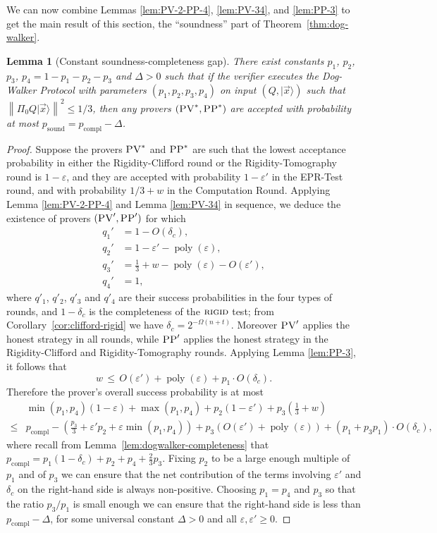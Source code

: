 \documentclass[11pt]{article}
\newtheorem{lemma}[theorem]{Lemma}
\theoremstyle{remark}
\theoremstyle{definition}
\newcommand{\ket}[1]{|#1\rangle}
\DeclareMathOperator{\poly}{poly}
\newcommand{\norm}[1]{\left\|#1\right\|}
\newcommand{\eps}{\varepsilon}
\newcommand{\rigid}{\textsc{rigid}}
\newcommand{\pv}{\textsc{PV}}
\newcommand{\pp}{\textsc{PP}}
\begin{document}
We can now combine Lemmas \ref{lem:PV-2-PP-4}, \ref{lem:PV-34}, and \ref{lem:PP-3} to get the main result of this section, the ``soundness'' part of Theorem~\ref{thm:dog-walker}.

\begin{lemma}[Constant soundness-completeness gap]\label{lem:dogwalker-soundness}
 There exist constants $p_1$, $p_2$, $p_3$, $p_4=1-p_1-p_2-p_3$ and $\Delta>0$ such that if the verifier executes the Dog-Walker Protocol with parameters $(p_1,p_2,p_3,p_4)$ on input $(Q,\ket{\vec{x}})$ such that $\norm{\Pi_0 Q\ket{\vec{x}}}^2\leq 1/3$, then any provers $(\pv^*,\pp^*)$ are accepted with probability at most $p_{\mathrm{sound}}=p_{\mathrm{compl}}-\Delta$. 
\end{lemma}

\begin{proof}
Suppose the provers $\pv^*$ and $\pp^*$ are such that the lowest acceptance probability in either the Rigidity-Clifford round or the Rigidity-Tomography round is $1- \eps$, and they are accepted with probability $1-\eps'$ in the EPR-Test round, and with probability $1/3+w$ in the Computation Round. Applying  Lemma \ref{lem:PV-2-PP-4} and Lemma \ref{lem:PV-34} in sequence, we deduce the existence of provers $(\pv',\pp')$ for which
\begin{align*}
q_1' &= 1- O(\delta_c), \\  q_2' &= 1-\eps'- \poly(\eps), \\ q_3' &= \frac13+w-
  \poly(\eps)-O(\eps'),\\ q_4' &= 1,
\end{align*}
where $q'_1$, $q'_2$, $q'_3$ and $q'_4$ are their success probabilities in the
  four types of rounds, and $1-\delta_c$ is the completeness of the
  $\rigid$ test; from Corollary~\ref{cor:clifford-rigid} we have $\delta_c = 2^{-\Omega(n+t)}$. Moreover $\pv'$ applies the honest strategy in all rounds, while $\pp'$ applies the honest strategy in the Rigidity-Clifford and Rigidity-Tomography rounds. Applying Lemma \ref{lem:PP-3}, it follows that 
$$w \,\leq\, O(\eps') + \poly(\eps) +p_1 \cdot O(\delta_c).$$
Therefore the prover's overall success probability is at most 
\begin{align*}
& \min(p_1,p_4)(1-\eps)+\max(p_1,p_4) + p_2(1-\eps')+p_3\left(\frac{1}{3}+w\right) \\
\leq & p_{\mathrm{compl}} - \left( \frac{p_3}{3} + \eps' p_2+\eps\min(p_1,p_4)\right)+ p_3\left(O(\eps')+\poly(\eps)\right)+ (p_1 + p_3p_1) \cdot O(\delta_c),
\end{align*}
where recall from Lemma~\ref{lem:dogwalker-completeness} that
  $p_{\mathrm{compl}} =  p_1(1-\delta_c)+p_2+p_4+\frac{2}{3}p_3$. Fixing $p_2$
  to be a large enough multiple of $p_1$ and of $p_3$ we can ensure that the net contribution
  of the terms involving $\eps'$ and $\delta_c$ on the right-hand side is always
  non-positive. Choosing $p_1=p_4$ and $p_3$ so that the ratio $p_3/p_1$ is small
  enough we can ensure that the right-hand side is less than $p_{\mathrm{compl}}
  -\Delta$, for some universal constant $\Delta>0$ and all $\eps,\eps'\geq 0$.
\end{proof}
\end{document}
